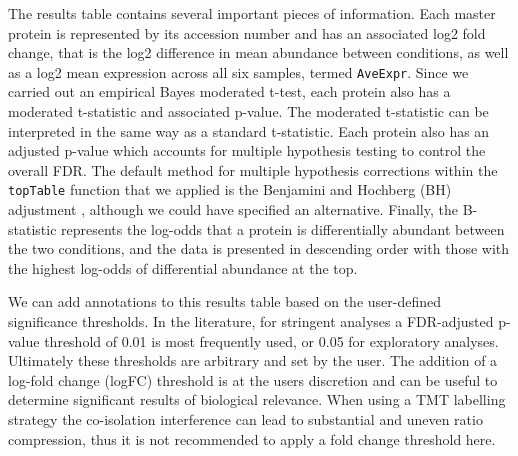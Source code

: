\documentclass[9pt,a4paper,]{extarticle}
\newenvironment{Shaded}{\begin{snugshade}}{\end{snugshade}}
\newcommand{\DecValTok}[1]{\textcolor[rgb]{0.00,0.00,0.81}{#1}}
\newcommand{\DocumentationTok}[1]{\textcolor[rgb]{0.56,0.35,0.01}{\textbf{\textit{#1}}}}
\newcommand{\FloatTok}[1]{\textcolor[rgb]{0.00,0.00,0.81}{#1}}
\newcommand{\FunctionTok}[1]{\textcolor[rgb]{0.00,0.00,0.00}{#1}}
\newcommand{\NormalTok}[1]{#1}
\newcommand{\OtherTok}[1]{\textcolor[rgb]{0.56,0.35,0.01}{#1}}
\newcommand{\SpecialCharTok}[1]{\textcolor[rgb]{0.00,0.00,0.00}{#1}}
\newcommand{\StringTok}[1]{\textcolor[rgb]{0.31,0.60,0.02}{#1}}
\begin{document}
The results table contains several important pieces of information. Each master
protein is represented by its accession number and has an associated log2 fold
change, that is the log2 difference in mean abundance between conditions, as
well as a log2 mean expression across all six samples, termed \texttt{AveExpr}. Since we
carried out an empirical Bayes moderated t-test, each protein also has a
moderated t-statistic and associated p-value. The moderated t-statistic can be
interpreted in the same way as a standard t-statistic. Each protein also has an
adjusted p-value which accounts for multiple hypothesis testing to control the
overall FDR. The default method for multiple hypothesis corrections within the
\texttt{topTable} function that we applied is the Benjamini and Hochberg (BH)
adjustment \citep{BH1995}, although we could have specified an alternative. Finally,
the B-statistic represents the log-odds that a protein is differentially abundant
between the two conditions, and the data is presented in descending order with
those with the highest log-odds of differential abundance at the top.

We can add annotations to this results table based on the user-defined
significance thresholds. In the literature, for stringent analyses a
FDR-adjusted p-value threshold of 0.01 is most frequently used, or 0.05 for
exploratory analyses. Ultimately these thresholds are arbitrary and set by the
user. The addition of a log-fold change (logFC) threshold is at the users
discretion and can be useful to determine significant results of biological
relevance. When using a TMT labelling strategy the co-isolation interference can
lead to substantial and uneven ratio compression, thus it is not recommended to
apply a fold change threshold here.

\begin{Shaded}
\end{Shaded}
\end{document}
